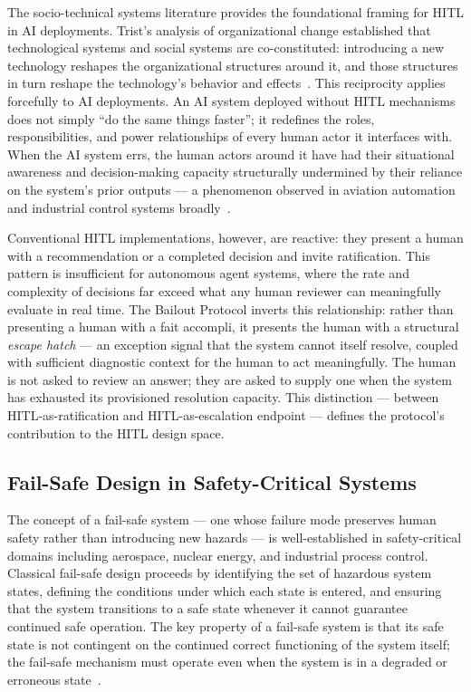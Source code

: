 The socio-technical systems literature provides the foundational framing for HITL in AI deployments. Trist's analysis of organizational change established that technological systems and social systems are co-constituted: introducing a new technology reshapes the organizational structures around it, and those structures in turn reshape the technology's behavior and effects~\cite{tristr81}. This reciprocity applies forcefully to AI deployments. An AI system deployed without HITL mechanisms does not simply ``do the same things faster''; it redefines the roles, responsibilities, and power relationships of every human actor it interfaces with. When the AI system errs, the human actors around it have had their situational awareness and decision-making capacity structurally undermined by their reliance on the system's prior outputs — a phenomenon observed in aviation automation and industrial control systems broadly~\cite{tristr81,bansal2019}.

Conventional HITL implementations, however, are reactive: they present a human with a recommendation or a completed decision and invite ratification. This pattern is insufficient for autonomous agent systems, where the rate and complexity of decisions far exceed what any human reviewer can meaningfully evaluate in real time. The Bailout Protocol inverts this relationship: rather than presenting a human with a fait accompli, it presents the human with a structural \emph{escape hatch} — an exception signal that the system cannot itself resolve, coupled with sufficient diagnostic context for the human to act meaningfully. The human is not asked to review an answer; they are asked to supply one when the system has exhausted its provisioned resolution capacity. This distinction — between HITL-as-ratification and HITL-as-escalation endpoint — defines the protocol's contribution to the HITL design space.

\subsection{Fail-Safe Design in Safety-Critical Systems}
\label{sec:failsafe}

The concept of a fail-safe system — one whose failure mode preserves human safety rather than introducing new hazards — is well-established in safety-critical domains including aerospace, nuclear energy, and industrial process control. Classical fail-safe design proceeds by identifying the set of hazardous system states, defining the conditions under which each state is entered, and ensuring that the system transitions to a safe state whenever it cannot guarantee continued safe operation. The key property of a fail-safe system is that its safe state is not contingent on the continued correct functioning of the system itself; the fail-safe mechanism must operate even when the system is in a degraded or erroneous state~\cite{dijkstra1982,wiener1948}.


